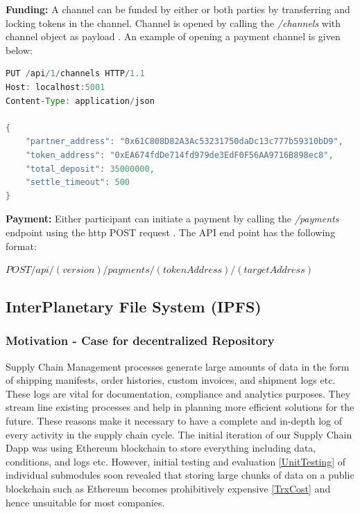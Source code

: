 \textbf{Funding:} A channel can be funded by either or both parties by transferring and locking tokens in the channel. Channel is opened by calling the \textit{/channels} with channel object as payload \cite{rad:001}. An example of opening a payment channel is given below: 
\begin{lstlisting}[language=Java,frame=single,tabsize=2,showspaces=false,showstringspaces=false,
  keywordstyle=\color{blue},morekeywords={function,returns,constant,memory},caption={Opening a Payement Channel on Raiden \cite{rad:001}}]
PUT /api/1/channels HTTP/1.1
Host: localhost:5001
Content-Type: application/json

{
    "partner_address": "0x61C808D82A3Ac53231750daDc13c777b59310bD9",
    "token_address": "0xEA674fdDe714fd979de3EdF0F56AA9716B898ec8",
    "total_deposit": 35000000,
    "settle_timeout": 500
}
\end{lstlisting}
\textbf{Payment:} Either participant can initiate a payment by calling the \textit{/payments} endpoint using the http POST request \cite{rad:001}. The API end point has the following format:

\textbf{$POST /api/(version)/payments/(tokenAddress)/(targetAddress)$} \cite{rad:001}
\clearpage


\subsection{InterPlanetary File System (IPFS)} \label{IPFS}
\subsubsection{Motivation - Case for decentralized Repository} \label{motivation}
Supply Chain Management processes generate large amounts of data in the form of shipping manifests, order histories, custom invoices, and shipment logs etc. These logs are vital for documentation, compliance and analytics purposes. They stream line existing processes and help in planning more efficient solutions for the future. These reasons make it necessary to have a complete and in-depth log of every activity in the supply chain cycle. The initial iteration of our Supply Chain Dapp was using Ethereum blockchain to store everything including data, conditions, and logs etc. However, initial testing and evaluation \ref{UnitTesting} of individual submodules soon revealed that storing large chunks of data on a public blockchain such as Ethereum becomes prohibitively expensive \ref{TrxCost} and hence unsuitable for most companies.

